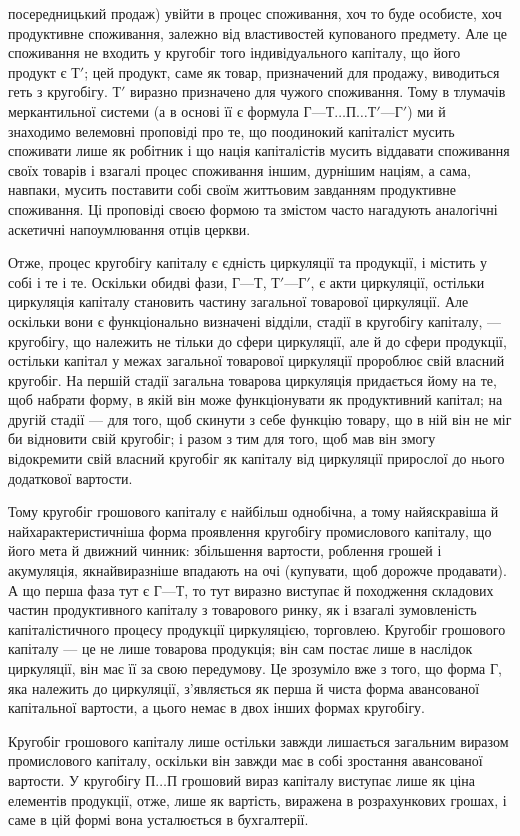 \parcont{}  %
посередницький продаж) увійти в процес споживання, хоч то буде
особисте, хоч продуктивне споживання, залежно від властивостей купованого
предмету. Але це споживання не входить у кругобіг того індивідуального
капіталу, що його продукт є $Т'$; цей продукт, саме як товар,
призначений для продажу, виводиться геть з кругобігу. $Т'$ виразно
призначено для чужого споживання. Тому в тлумачів меркантильної
системи (а в основі її є формула $Г — Т\dots{} П\dots{} Т' — Г'$) ми й знаходимо
велемовні проповіді про те, що поодинокий капіталіст мусить споживати
лише як робітник і що нація капіталістів мусить віддавати споживання
своїх товарів і взагалі процес споживання іншим, дурнішим
націям, а сама, навпаки, мусить поставити собі своїм життьовим
завданням продуктивне споживання. Ці проповіді своєю формою та
змістом часто нагадують аналогічні аскетичні напоумлювання отців
церкви.

Отже, процес кругобігу капіталу є єдність циркуляції та продукції,
і містить у собі і те і те. Оскільки обидві фази, $Г — Т$, $Т' — Г'$, є акти
циркуляції, остільки циркуляція капіталу становить частину загальної
товарової циркуляції. Але оскільки вони є функціонально визначені відділи,
стадії в кругобігу капіталу, — кругобігу, що належить не тільки до
сфери циркуляції, але й до сфери продукції, остільки капітал у межах
загальної товарової циркуляції пророблює свій власний кругобіг. На першій
стадії загальна товарова циркуляція придається йому на те, щоб набрати
форму, в якій він може функціонувати як продуктивний капітал; на
другій стадії — для того, щоб скинути з себе функцію товару, що в ній
він не міг би відновити свій кругобіг; і разом з тим для того, щоб мав
він змогу відокремити свій власний кругобіг як капіталу від циркуляції
прирослої до нього додаткової вартости.

Тому кругобіг грошового капіталу є найбільш однобічна, а тому
найяскравіша й найхарактеристичніша форма проявлення кругобігу промислового
капіталу, що його мета й движний чинник: збільшення вартости,
роблення грошей і акумуляція, якнайвиразніше впадають на очі (купувати,
щоб дорожче продавати). А що перша фаза тут є $Г — Т$, то тут
виразно виступає й походження складових частин продуктивного капіталу
з товарового ринку, як і взагалі зумовленість капіталістичного процесу
продукції циркуляцією, торговлею. Кругобіг грошового капіталу — це не
лише товарова продукція; він сам постає лише в наслідок циркуляції, він
має її за свою передумову. Це зрозуміло вже з того, що форма $Г$, яка
належить до циркуляції, з’являється як перша й чиста форма авансованої
капітальної вартости, а цього немає в двох інших формах кругобігу.

Кругобіг грошового капіталу лише остільки завжди лишається загальним
виразом промислового капіталу, оскільки він завжди має в собі зростання
авансованої вартости. У кругобігу $П\dots{} П$ грошовий вираз капіталу
виступає лише як ціна елементів продукції, отже, лише як вартість,
виражена в розрахункових грошах, і саме в цій формі вона усталюється
в бухгалтерії.
